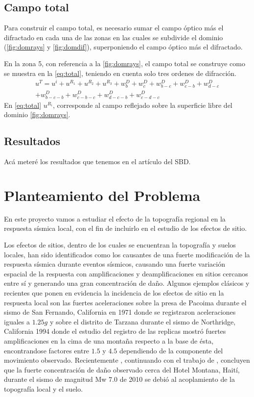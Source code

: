 \documentclass[spanish,letterpaper,12pt,twoside,openany]{article}
\begin{document}
\subsection{Campo total}
%
Para construir el campo total, es necesario sumar el campo óptico más el difractado en cada una de las zonas en las cuales se subdivide el dominio (\cref{fig:domrays} y \cref{fig:domdif}), superponiendo el campo óptico más el difractado.

En la zona 5, con referencia a la \cref{fig:domrays}, el campo total se construye como se muestra en la \cref{eq:total}, teniendo en cuenta solo tres ordenes de difracción.
%
\begin{eqnarray}
u^T=u^i+u^{R_1}+u^{R_2}+u^{R_3}+w^D_b+w^D_c+w^D_{b-c}+w^D_{c-b}+w^D_{d-c} \nonumber\\
+w^D_{b-c-b}+w^D_{c-b-c}+w^D_{d-c-b}+w^D_{c-d-c}
\label{eq:total}
\end{eqnarray}
%
En \cref{eq:total} $u^{R_i}$, corresponde al campo reflejado sobre la superficie libre del dominio \ref{fig:domrays}.
%
%
%
%
%
\subsection{Resultados}
%
Acá meteré los resultados que tenemos en el artículo del SBD.
%
%
%
%
%
\newpage
%
\section{Planteamiento del Problema}
%
En este proyecto vamos a estudiar el efecto de la topografía regional en la respuesta sísmica local, con el fin de incluirlo en el estudio de los efectos de sitio.

Los efectos de sitios, dentro de los cuales se encuentran la topografía y suelos locales, han sido identificados como los causantes de una fuerte modificación de la respuesta sísmica durante eventos sísmicos, causando una fuerte variación espacial de la respuesta con amplificaciones y deamplificaciones en sitios cercanos entre sí y generando una gran concentración de daño. Algunos ejemplos clásicos y recientes que ponen en evidencia la incidencia de los efectos de sitio en la respuesta local son las fuertes aceleraciones sobre la presa de Pacoima durante el sismo de San Fernando, California en 1971 \citep{trifunac1971analysis} donde se registraron aceleraciones iguales a $1.25g$ y sobre el distrito de Tarzana durante el sismo de Northridge, California 1994 \citep{spudich1996directional} donde el estudio del registro de las replicas mostró fuertes amplificaciones en la cima de una montaña respecto a la base de ésta, encontrandose factores entre $1.5$ y $4.5$ dependiendo de la componente del movimiento observado. Recientemente \citep{Assimaki2013}, continuando con el trabajo de \citep{Hough2011}, concluyen que la fuerte concentración de daño observado cerca del Hotel Montana, Haití, durante el sismo de magnitud Mw $7.0$ de 2010 se debió al acoplamiento de la topografía local y el suelo.
\end{document}
